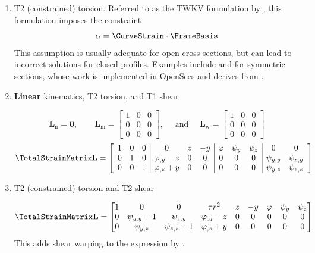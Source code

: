 \begin{enumerate}
\item T2 (constrained) torsion. Referred to as the TWKV formulation by \cite{armero2021modeling}, this formulation imposes the constraint 
  \[
  \alpha = \CurveStrain \cdot \FrameBasis
  \]
  This assumption is usually adequate for open cross-sections, but can lead to incorrect solutions for closed profiles.
  Examples include \cite{nukala2004mixed} and \cite{zhang2011formulation} for symmetric sections, whose work is implemented in OpenSees and derives from \cite{alemdar2001distributed}.

\item \textbf{Linear} kinematics, T2 torsion, and T1 shear

$$
\mathbf{L}_{\mathrm{n}} = \bm{0},
\qquad
\mathbf{L}_{\mathrm{m}} = \left[\begin{matrix}
1 & 0 & 0\\
0 & 0 & 0\\
0 & 0 & 0
\end{matrix}\right],
\quad\text{ and }\quad
\mathbf{L}_{\mathrm{w}} = \left[\begin{matrix}
1 & 0 & 0\\
0 & 0 & 0\\
0 & 0 & 0
\end{matrix}\right]
$$
$$
\TotalStrainMatrix\mathbf{L} = \left[\begin{array}{ccc|ccc|ccc|cc}
1 & 0 & 0 & 0 & z & - y & \varphi & \psi_{y} & \psi_{z} & 0 & 0\\
0 & 1 & 0 & \varphi_{,y} - z & 0 & 0 & 0 & 0 & 0 & \psi_{y,y} & \psi_{z,y}\\
0 & 0 & 1 & \varphi_{,z} + y & 0 & 0 & 0 & 0 & 0 & \psi_{y,z} & \psi_{z,z}\end{array}\right]
$$

\item T2 (constrained) torsion and T2 shear

$$
\TotalStrainMatrix\mathbf{L} = \left[\begin{matrix}
1 & 0 & 0 & \tau r^2 & z & - y & \varphi & \psi_{y} & \psi_{z}\\
0 & \psi_{y,y} + 1 & \psi_{z,y} & \varphi_{,y} - z & 0 & 0 & 0 & 0 & 0\\
0 & \psi_{y,z} & \psi_{z,z} + 1 & \varphi_{,z} + y & 0 & 0 & 0 & 0 & 0\end{matrix}\right]
$$
This adds shear warping to the expression by \cite{battini2002plastic}.


\end{enumerate}
